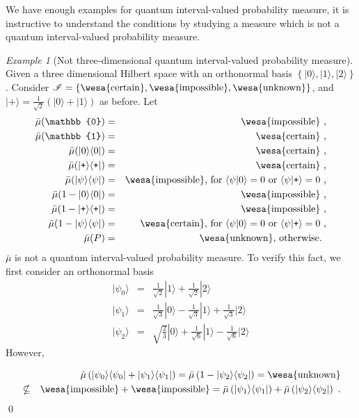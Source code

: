 \documentclass{article}
\theoremstyle{remark}
\newtheorem{example}{Example}
\newcommand{\ket}[1]{|#1\rangle}
\newcommand{\ip}[2]{\langle #1 | #2 \rangle}
\newcommand{\proj}[1]{|#1 \rangle\langle #1 |}
\newcommand{\ps}{\texttt{+}}
\newcommand{\imposs}{{\mbox{\wesa{impossible}}}}
\newcommand{\necess}{{\mbox{\wesa{certain}}}}
\newcommand{\unknown}{{\mbox{\wesa{unknown}}}}
\begin{document}
We have enough examples for quantum interval-valued probability measure,
it is instructive to understand the conditions by studying a measure
which is not a quantum interval-valued probability measure.

\begin{example}[Not three-dimensional quantum interval-valued probability
measure] Given a three dimensional Hilbert space with an orthonormal
basis $\left\{ \ket{0},\ket{1},\ket{2}\right\} $. Consider\emph{
$\mathscr{I}=\left\{ \necess,\imposs,\unknown\right\} $}, and $\ket{\ps}=\frac{1}{\sqrt{2}}(\ket{0}+\ket{1})$
as before. Let
\begin{eqnarray*}
\bar{\mu}(\mathbb{0}) & = & \imposs\textrm{ ,}\\
\bar{\mu}(\mathbb{1}) & = & \necess\textrm{ ,}\\
\bar{\mu}(\proj{0}) & = & \necess\textrm{ ,}\\
\bar{\mu}(\proj{\ps}) & = & \necess\textrm{ ,}\\
\bar{\mu}(\proj{\psi}) & = & \imposs\textrm{, for }\ip{\psi}{0}=0\textrm{ or }\ip{\psi}{\ps}=0\textrm{ ,}\\
\bar{\mu}(1-\proj{0}) & = & \imposs\textrm{ ,}\\
\bar{\mu}(1-\proj{\ps}) & = & \imposs\textrm{ ,}\\
\bar{\mu}(1-\proj{\psi}) & = & \necess\textrm{, for }\ip{\psi}{0}=0\textrm{ or }\ip{\psi}{\ps}=0\textrm{ ,}\\
\bar{\mu}(P) & = & \unknown\textrm{, otherwise. }
\end{eqnarray*}
$\bar{\mu}$ is not a quantum interval-valued probability measure. To verify
this fact, we first consider an orthonormal basis
\begin{eqnarray*}
\ket{\psi_{0}} & = & \frac{1}{\sqrt{2}}\ket{1}+\frac{1}{\sqrt{2}}\ket{2}\\
\ket{\psi_{1}} & = & \frac{1}{\sqrt{3}}\ket{0}-\frac{1}{\sqrt{3}}\ket{1}+\frac{1}{\sqrt{3}}\ket{2}\\
\ket{\psi_{2}} & = & \sqrt{\frac{2}{3}}\ket{0}+\frac{1}{\sqrt{6}}\ket{1}-\frac{1}{\sqrt{6}}\ket{2}
\end{eqnarray*}
However, 

\begin{eqnarray*}
 &  & \bar{\mu}\left(\proj{\psi_{0}}+\proj{\psi_{1}}\right)=\bar{\mu}\left(1-\proj{\psi_{2}}\right)=\unknown\\
 & \nsubseteq & \imposs+\imposs=\bar{\mu}\left(\proj{\psi_{1}}\right)+\bar{\mu}\left(\proj{\psi_{2}}\right)\textrm{ .}
\end{eqnarray*}
\qed\end{example}
\end{document}
